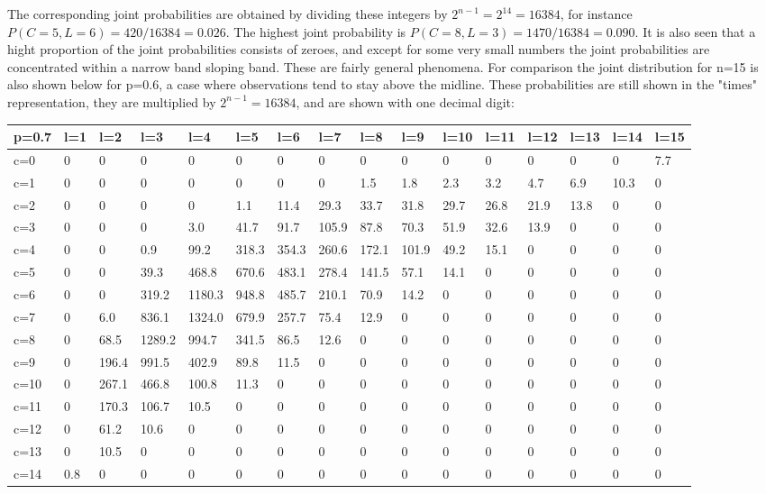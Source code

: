 \normalsize

The corresponding joint probabilities are obtained by dividing these integers by $2^{n-1}=2^{14}=16384$, for instance $P(C=5, L=6)=420/16384=0.026$. The highest joint probability is $P(C=8, L=3)=1470/16384=0.090$. It is also seen that a hight proportion of the joint probabilities consists of zeroes, and except for some very small numbers the joint probabilities are concentrated within a narrow band sloping band. These are fairly general phenomena. For comparison the joint distribution for n=15 is also shown below for p=0.6, a case where observations tend to stay above the midline. These probabilities are still shown in the "times" representation, they are multiplied by $2^{n-1}=16384$, and are shown with one decimal digit:

\tiny{
\begin{tabular}{l | l l l l l l l l l l l l l l l}
\hline
p=0.7&l=1&l=2&l=3&l=4&l=5&l=6&l=7&l=8&l=9&l=10&l=11&l=12&l=13&l=14&l=15\\
\hline
c=0&0&0&0&0&0&0&0&0&0&0&0&0&0&0&7.7\\
c=1&0&0&0&0&0&0&0&1.5&1.8&2.3&3.2&4.7&6.9&10.3&0\\
c=2&0&0&0&0&1.1&11.4&29.3&33.7&31.8&29.7&26.8&21.9&13.8&0&0\\
c=3&0&0&0&3.0&41.7&91.7&105.9&87.8&70.3&51.9&32.6&13.9&0&0&0\\
c=4&0&0&0.9&99.2&318.3&354.3&260.6&172.1&101.9&49.2&15.1&0&0&0&0\\
c=5&0&0&39.3&468.8&670.6&483.1&278.4&141.5&57.1&14.1&0&0&0&0&0\\
c=6&0&0&319.2&1180.3&948.8&485.7&210.1&70.9&14.2&0&0&0&0&0&0\\
c=7&0&6.0&836.1&1324.0&679.9&257.7&75.4&12.9&0&0&0&0&0&0&0\\
c=8&0&68.5&1289.2&994.7&341.5&86.5&12.6&0&0&0&0&0&0&0&0\\
c=9&0&196.4&991.5&402.9&89.8&11.5&0&0&0&0&0&0&0&0&0\\
c=10&0&267.1&466.8&100.8&11.3&0&0&0&0&0&0&0&0&0&0\\
c=11&0&170.3&106.7&10.5&0&0&0&0&0&0&0&0&0&0&0\\
c=12&0&61.2&10.6&0&0&0&0&0&0&0&0&0&0&0&0\\
c=13&0&10.5&0&0&0&0&0&0&0&0&0&0&0&0&0\\
c=14&0.8&0&0&0&0&0&0&0&0&0&0&0&0&0&0\\
\hline
\end{tabular}
}

\normalsize

